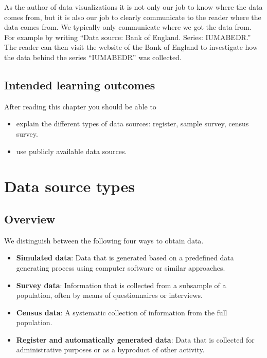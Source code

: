 \documentclass[
]{book}
\providecommand{\tightlist}{%
  \setlength{\itemsep}{0pt}\setlength{\parskip}{0pt}}
\begin{document}
As the author of data visualizations it is not only our job to know where the data comes from, but it is also our job to clearly communicate to the reader where the data comes from. We typically only communicate where we got the data from. For example by writing ``Data source: Bank of England.
Series: IUMABEDR.'' The reader can then visit the website of the Bank of England to investigate how the data behind the series ``IUMABEDR'' was collected.

\hypertarget{intended-learning-outcomes-6}{%
\subsection*{Intended learning outcomes}\label{intended-learning-outcomes-6}}

After reading this chapter you should be able to

\begin{itemize}
\tightlist
\item
  explain the different types of data sources: register, sample survey, census survey.
\item
  use publicly available data sources.
\end{itemize}

\hypertarget{data-source-types}{%
\section{Data source types}\label{data-source-types}}

\hypertarget{overview}{%
\subsection*{Overview}\label{overview}}

We distinguish between the following four ways to obtain data.

\begin{itemize}
\tightlist
\item
  \textbf{Simulated data}: Data that is generated based on a predefined data generating process using computer software or similar approaches.
\item
  \textbf{Survey data}: Information that is collected from a subsample of a population, often by means of questionnaires or interviews.
\item
  \textbf{Census data}: A systematic collection of information from the full population.
\item
  \textbf{Register and automatically generated data}: Data that is collected for administrative purposes or as a byproduct of other activity.
\end{itemize}
\end{document}

